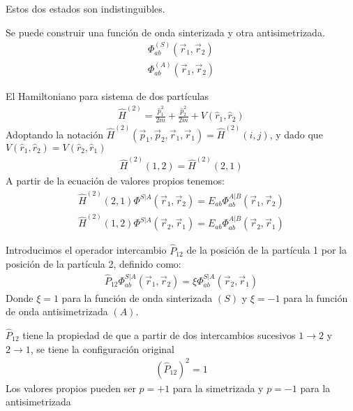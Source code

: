 \documentclass{article}
\begin{document}
Estos dos estados son indistinguibles. 

Se puede construir una función de onda sinterizada y otra antisimetrizada.  
\begin{gather*}
  \Phi_{ab } ^ {(S )} (\vec r_1 , \vec r_2 ) \\
  \Phi_{ab } ^ {(A )} (\vec r_1 , \vec r_2 ) 
\end{gather*}

\hfill 

\hfill 

El Hamiltoniano para sistema de dos partículas 
\begin{gather*}
  \hat H ^ {(2) }= \frac{\hat p_1 ^2}{2m } + \frac{\hat p_2^2 }{2m } + V(\hat r_1 , \hat r_2 )
\end{gather*}
Adoptando la notación $ \hat H ^ {(2) }(\vec p_1, \vec p_2 , \vec r_1 , \vec r_1 ) = \hat H ^ {(2) }(i,j) $, y dado que $  V(\hat r_1 , \hat r_2 ) =  V(\hat r_2 , \hat r_1 ) $
\begin{gather*}
   \hat H ^ {(2) }(1,2) = \hat H ^ {(2) }(2,1)
\end{gather*}
A partir de la ecuación de valores propios tenemos: 
\begin{gather*}
   \hat H ^ {(2) }(2,1) \Phi ^ {S|A }(\vec r_1,\vec r_2 ) = E _{ab } \Phi _{ab } ^ {A|B } (\vec r_1 , \vec r_2 ) \\
   \hat H ^ {(2) }(1,2) \Phi ^ {S|A }(\vec r_2,\vec r_1 ) = E _{ab } \Phi _{ab } ^ {A|B } (\vec r_2 , \vec r_1 ) 
\end{gather*}

\hfill 

\hfill 

Introducimos el operador intercambio $ \hat P _{12 }  $ de la posición de la partícula 1 por la posición de la partícula 2, definido como: 
\begin{gather*}
  \hat P _{12 }  \Phi _{ab } ^ {S|A } (\vec r_1, \vec r_2 ) = \xi \Phi _{ab } ^ {S|A } (\vec r_2, \vec r_1 )
\end{gather*}
Donde $ \xi = 1  $ para la función de onda sinterizada $ (S) $ y $ \xi = - 1  $ para la función de onda antisimetrizada $ (A)  $.

$ \hat P _{12 }  $ tiene la propiedad de que a partir de dos intercambios sucesivos $ 1 \rightarrow 2  $ y $ 2 \rightarrow 1  $, se tiene la configuración original 
\begin{gather*}
  (\hat P _{12 } )^2 = 1  
\end{gather*}
Los valores propios pueden ser $ p = + 1  $ para la simetrizada y $ p = - 1  $ para la antisimetrizada 
\end{document}
